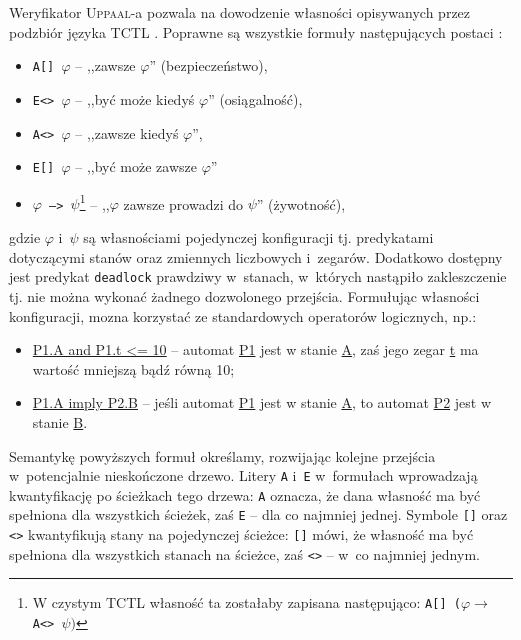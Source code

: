 \documentclass{pracamgr}
\newcommand{\upp}{\textsc{Uppaal}}
\theoremstyle{plain}
\begin{document}
Weryfikator \upp-a pozwala na dowodzenie własności opisywanych przez
podzbiór języka TCTL \cite{acd:mc}. Poprawne są wszystkie formuły
następujących postaci \cite{by-lncs04}:
\begin{itemize}
  \item \texttt{A[] $\varphi$} -- ,,zawsze $\varphi$'' (bezpieczeństwo),
  \item \texttt{E<> $\varphi$} -- ,,być może kiedyś $\varphi$''
  (osiągalność),
  \item \texttt{A<> $\varphi$} -- ,,zawsze kiedyś $\varphi$'',
  \item \texttt{E[] $\varphi$} -- ,,być może zawsze $\varphi$''
  \item \texttt{$\varphi$ --> $\psi$}\footnote{W czystym TCTL własność
    ta zostałaby zapisana następująco: \texttt{A[]
      ($\varphi\rightarrow$ A<> $\psi)$}} -- ,,$\varphi$ zawsze
  prowadzi do $\psi$'' (żywotność),
\end{itemize}
gdzie $\varphi$ i~$\psi$ są własnościami pojedynczej konfiguracji
tj. predykatami dotyczącymi stanów oraz zmiennych liczbowych
i~zegarów. Dodatkowo dostępny jest predykat \texttt{deadlock} prawdziwy
w~stanach, w~których nastąpiło zakleszczenie tj. nie można wykonać
żadnego dozwolonego przejścia. Formułując własności konfiguracji,
mozna korzystać ze standardowych operatorów logicznych, np.:

\begin{samepage}
\begin{itemize}
  \item \url{P1.A and P1.t <= 10} -- automat \url{P1} jest w stanie
  \url{A}, zaś jego zegar \url{t} ma wartość mniejszą bądź równą 10;
  \item \url{P1.A imply P2.B} -- jeśli automat \url{P1} jest w stanie
  \url{A}, to automat \url{P2} jest w stanie \url{B}.
\end{itemize}
\end{samepage}

Semantykę powyższych formuł określamy, rozwijając kolejne
przejścia w~potencjalnie nieskończone drzewo. Litery \texttt{A}
i~\texttt{E} w~formułach wprowadzają kwantyfikację po ścieżkach tego drzewa:
\texttt{A} oznacza, że dana własność ma być spełniona dla wszystkich
ścieżek, zaś \texttt{E} -- dla co najmniej jednej. Symbole
\texttt{[]} oraz \texttt{<>} kwantyfikują stany na pojedynczej
ścieżce: \texttt{[]} mówi, że własność ma być spełniona dla wszystkich
stanach na ścieżce, zaś \texttt{<>} -- w~co najmniej jednym.
\end{document}
